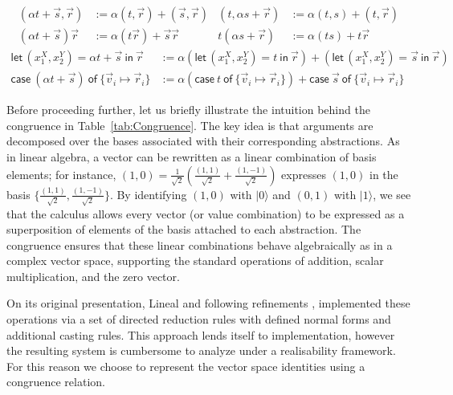 \documentclass[a4paper,UKenglish,numberwithinsect,pdfa,anonymous]{lipics-v2021}
\theoremstyle{restatestyle}
\newcommand\ket[1]{\ensuremath{|#1\rangle}}
\def\Pair#1#2{(#1,#2)} %
\def\letkeyword{\mathsf{let}}
\def\inkeyword{\mathsf{in}}
\def\LetP#1#2#3#4#5#6{\letkeyword\,\Pair{#1^{#2}}{#3^{#4}}=#5~\inkeyword~#6}
\def\gencasei#1#2#3{\ensuremath{\mathsf{case}~#1~\mathsf{of}~\{#2\mapsto #3\}}}
\begin{document}
\begin{table}[t]
  \begin{align*}
    \Pair{\alpha  t+\vec{s}}{\vec{r}} 
    &:= \alpha\Pair{t}{\vec{r}} + \Pair{\vec{s}}{\vec{r}} &
    \Pair{t}{\alpha s+\vec{r}} 
    &:= \alpha\Pair{t}{s} + \Pair{t}{\vec{r}}\\
    (\alpha t+\vec{s})\vec{r} &:= \alpha(t \vec{r})+\vec{s}\vec{r} &
    t(\alpha s+\vec{r}) &:= \alpha (t s)+ t \vec{r}
  \end{align*}
  \vspace{-2\baselineskip}
  \begin{align*}
    \LetP{x_1}{X}{x_2}{Y}{\alpha t+\vec{s}}{\vec{r}}
    &:= \alpha(\LetP{x_1}{X}{x_2}{Y}{t}{\vec{r}})
      +(\LetP{x_1}{X}{x_2}{Y}{\vec{s}}{\vec{r}}) 
      \\
    \gencasei{(\alpha t+\vec{s})}{\vec{v}_{i}}{\vec{r}_{i}}
    &:= \alpha(\gencasei{t}{\vec{v}_i}{\vec{r}_i}) + 
      \gencasei{\vec{s}}{\vec{v}_i}{\vec{r}_i}
  \end{align*}
  \caption{Syntax sugar for term combinations}
  \label{tab:Macros}
\end{table}

Before proceeding further, let us briefly illustrate the intuition behind the
congruence in Table~\ref{tab:Congruence}.  
The key idea is that arguments are decomposed over the bases associated with
their corresponding abstractions.  
As in linear algebra, a vector can be rewritten as a linear combination of
basis elements; for instance,
\(
  (1,0)
  = \tfrac{1}{\sqrt{2}}\!\left(\tfrac{(1,1)}{\sqrt{2}}
  + \tfrac{(1,-1)}{\sqrt{2}}\right)
\)
expresses $(1,0)$ in the basis
$\{\tfrac{(1,1)}{\sqrt{2}}, \tfrac{(1,-1)}{\sqrt{2}}\}$.
By identifying $(1,0)$ with $\ket{0}$ and $(0,1)$ with $\ket{1}$, we see that
the calculus allows every vector (or value combination) to be expressed as a
superposition of elements of the basis attached to each abstraction.
The congruence ensures that these linear combinations behave algebraically as
in a complex vector space, supporting the standard operations of addition,
scalar multiplication, and the zero vector.

On its original presentation, Lineal \cite{ArrighiDowekLMCS17} and following
refinements \cite{DiazcaroDowekRinaldiBIO19,DiazcaroMonzonAPLAS25}, implemented
these operations via a set of directed reduction rules with defined normal forms
and additional casting rules. This approach lends itself to implementation, however
the resulting system is cumbersome to analyze under a realisability framework.
For this reason we choose to represent the vector space identities using a
congruence relation.
\end{document}
